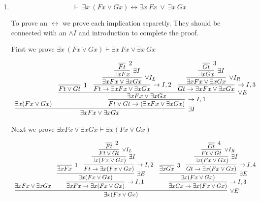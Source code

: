 \documentclass[11pt]{report}
\begin{document}
\begin{enumerate}
\begin{enumerate}
			\newpage
			\item $$\vdash \ \exists x \ (Fx \lor Gx) \leftrightarrow \exists x \ Fx \ \lor \ \exists x \ Gx$$
			
			To prove an $\leftrightarrow$ we prove each implication separetly. They should be connected with an $\land I$ and introduction to complete the proof. 
			
			First we prove $\exists x \ (Fx \lor Gx) \vdash \exists x \ Fx \lor \exists x \ Gx$
			
			\begin{center}
				$\begin{array}{c}
					\infer[\exists I]{\exists x Fx \lor \exists x Gx}
						{\exists x (Fx \lor Gx)
						&
						\infer[\to I,1]{Ft \lor Gt \to (\exists x Fx \lor \exists x Gx)}
							{\infer[\lor E]{\exists x Fx \lor \exists x Gx}
								{\infer[1]{Ft \lor Gt}{}
								&
								\infer[\to I,2]{Ft \to \exists x Fx \lor \exists x Gx}
									{\infer[\lor I_{L}]{\exists x Fx \lor \exists x Gx}
										{\infer[\exists I]{\exists x F x}
											{\infer[2]{Ft}{}}}}
								&
								\infer[\to I,3]{Gt \to \exists x Fx \lor \exists x Gx}
									{\infer[\lor I_{R}]{\exists x Fx \lor \exists x Gx}
										{\infer[\exists I]{\exists x G x}
											{\infer[3]{Gt}{}}}}}}}
				\end{array}$
			\end{center}
			
			Next we prove $\exists x Fx \lor \exists x Gx \vdash \exists x (Fx \lor Gx)$
			
			\begin{center}
				$\begin{array}{c}
					\infer[\lor E]{\exists x (Fx \lor Gx)}
						{\exists x F x \lor \exists x G x
						&
						\infer[\to I,1]{\exists x Fx \to \exists x (Fx \lor Gx)}
							{\infer[\exists E]{\exists x (Fx \lor Gx)}
								{\infer[1]{\exists x Fx}{}
								&
								\infer[\to I,2]{Ft \to \exists x (Fx \lor Gx)}
									{\infer[\exists I]{\exists x (Fx \lor Gx)}
										{\infer[\lor I_{L}]{Ft \lor Gt}
											{\infer[2]{Ft}{}}}}}}
						&
						\infer[\to I,3]{\exists x Gx \to \exists x (Fx \lor Gx)}
							{\infer[\exists E]{\exists x (Fx \lor Gx)}
								{\infer[3]{\exists x Gx}{}
								&
								\infer[\to I,4]{Gt \to \exists x (Fx \lor Gx)}
									{\infer[\exists I]{\exists x (Fx \lor Gx)}
										{\infer[\lor I_{R}]{Ft \lor Gt}
											{\infer[4]{Gt}{}}}}}}}
				\end{array}$
			\end{center}			
			


\end{enumerate}
\end{enumerate}
\end{document}
